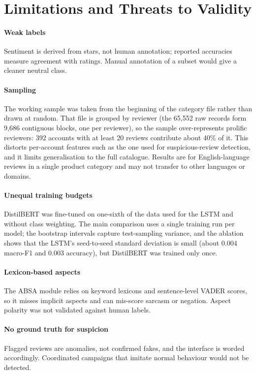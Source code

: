 \documentclass[conference]{IEEEtran}
\begin{document}
\section{Limitations and Threats to Validity}
\paragraph{Weak labels} Sentiment is derived from stars, not human annotation; reported accuracies measure agreement with ratings. Manual annotation of a subset would give a cleaner neutral class.
\paragraph{Sampling} The working sample was taken from the beginning of the category file rather than drawn at random. That file is grouped by reviewer (the 65{,}552 raw records form 9{,}686 contiguous blocks, one per reviewer), so the sample over-represents prolific reviewers: 392 accounts with at least 20 reviews contribute about 40\% of it. This distorts per-account features such as the one used for suspicious-review detection, and it limits generalisation to the full catalogue. Results are for English-language reviews in a single product category and may not transfer to other languages or domains.
\paragraph{Unequal training budgets} DistilBERT was fine-tuned on one-sixth of the data used for the LSTM and without class weighting. The main comparison uses a single training run per model; the bootstrap intervals capture test-sampling variance, and the ablation shows that the LSTM's seed-to-seed standard deviation is small (about 0.004 macro-F1 and 0.003 accuracy), but DistilBERT was trained only once.
\paragraph{Lexicon-based aspects} The ABSA module relies on keyword lexicons and sentence-level VADER scores, so it misses implicit aspects and can mis-score sarcasm or negation. Aspect polarity was not validated against human labels.
\paragraph{No ground truth for suspicion} Flagged reviews are anomalies, not confirmed fakes, and the interface is worded accordingly. Coordinated campaigns that imitate normal behaviour would not be detected.
\end{document}
